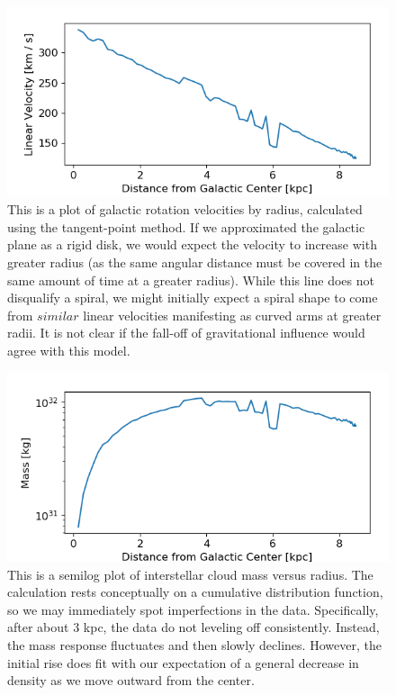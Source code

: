 \documentclass[12pt]{article}
\begin{document}
\begin{figure}
	\centering
	\includegraphics[width=.8\linewidth]{inner_vel_distro}
	\caption{This is a plot of galactic rotation velocities by radius, calculated using the tangent-point method. If we approximated the galactic plane as a rigid disk, we would expect the velocity to increase with greater radius (as the same angular distance must be covered in the same amount of time at a greater radius). While this line does not disqualify a spiral, we might initially expect a spiral shape to come from $similar$ linear velocities manifesting as curved arms at greater radii. It is not clear if the fall-off of gravitational influence would agree with this model.}
	\label{fig:inner_vel_distro}
\end{figure}

\begin{figure}
	\centering
	\includegraphics[width=.8\linewidth]{inner_mass_distro}
	\caption{This is a semilog plot of interstellar cloud mass versus radius. The calculation rests conceptually on a cumulative distribution function, so we may immediately spot imperfections in the data. Specifically, after about 3 kpc, the data do not leveling off consistently. Instead, the mass response fluctuates and then slowly declines. However, the initial rise does fit with our expectation of a general decrease in density as we move outward from the center.}
	\label{fig:inner_mass_distro}
\end{figure}
\end{document}
